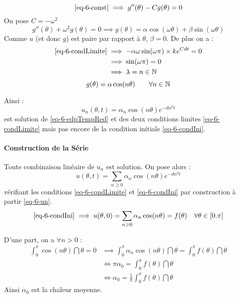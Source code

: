 		$$
			\eqref{eq-6-const} \implies g''(\theta) - Cg(\theta) = 0
		$$
		On pose $C=-\omega^2$
		$$
			g''(\theta) + \omega^2 g(\theta) = 0 \implies g(\theta) = \alpha \cos(\omega\theta) + \beta \sin(\omega\theta)
		$$
		Comme $u$ (et donc $g$) est paire par rapport à $\theta$, $\beta=0$. De plus on a :
		\begin{align*}
			\eqref{eq-6-condLimite} &\implies -\alpha\omega \sin(\omega\pi) \times ke^{Cdt} = 0		\\
										&\implies \sin(\omega\pi) = 0	\\
										&\implies \lambda = n \in \mathbb{N}
		\end{align*}
		$$
			g(\theta) = \alpha \cos(n\theta) \qquad \forall n\in\mathbb{N}
		$$

		Ainsi :
		\begin{equation}
			\label{eq-6-un}
			u_n(\theta,t) = \alpha_n \cos(n\theta) e^{-dn^2t}
		\end{equation}
		est solution de \eqref{eq-6-edpTempRed} et des deux conditions limites \eqref{eq-6-condLimite} mais pas encore de la condition initiale \eqref{eq-6-condIni}.

	\paragraph{Construction de la Série}

		Toute combinaison linéaire de $u_n$ est solution.
		On pose alors :
		\begin{equation}
			\label{eq-6-uSerie}
			u(\theta,t) = \sum_{n\geq0} \alpha_n \cos(n\theta) e^{-dn^2t}
		\end{equation}
		vérifiant les conditions \eqref{eq-6-condLimite} et \eqref{eq-6-condIni} par construction à partir \eqref{eq-6-un}.
		$$
			\eqref{eq-6-condIni} \implies u(\theta,0) = \sum_{n\geq0} \alpha_n \cos(n\theta) = f(\theta)	\quad \forall\theta\in[0.\pi]\\
		$$
 
		D'une part, on a $\forall n > 0$ :
		\begin{align*}
			\int_0^\pi \cos(n\theta) \dint{\theta} = 0
				&\implies \int_0^\pi \alpha_n\cos(n\theta) \dint{\theta} = \int_0^\pi f(\theta) \dint{\theta}		\\
				&\iff \pi\alpha_0 = \int_0^\pi f(\theta) \dint{\theta} \\
				&\iff \alpha_0 = \frac{1}{\pi}\int_0^\pi f(\theta) \dint{\theta} 
		\end{align*}
		Ainsi $\alpha_0$ est la chaleur moyenne.

